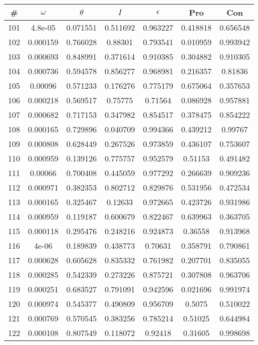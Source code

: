 \newpage
\begin{table}
\begin{tabular}{c|c|c|c|c|c|c}
\# & $\omega$ & $\theta$ & $I$ & $\epsilon$ & Pro & Con\\
\hline
101 & 4.8e-05 & 0.071551 & 0.511692 & 0.963227 & 0.418818 & 0.656548\\
102 & 0.000159 & 0.766028 & 0.88301 & 0.793541 & 0.010959 & 0.993942\\
103 & 0.000693 & 0.848991 & 0.371614 & 0.910385 & 0.304882 & 0.910305\\
104 & 0.000736 & 0.594578 & 0.856277 & 0.968981 & 0.216357 & 0.81836\\
105 & 0.00096 & 0.571233 & 0.176276 & 0.775179 & 0.675064 & 0.357653\\
106 & 0.000218 & 0.569517 & 0.75775 & 0.71564 & 0.086928 & 0.957881\\
107 & 0.000682 & 0.717153 & 0.347982 & 0.854517 & 0.378475 & 0.854222\\
108 & 0.000165 & 0.729896 & 0.040709 & 0.994366 & 0.439212 & 0.99767\\
109 & 0.000808 & 0.628449 & 0.267526 & 0.973859 & 0.436107 & 0.753607\\
110 & 0.000959 & 0.139126 & 0.775757 & 0.952579 & 0.51153 & 0.491482\\
111 & 0.00066 & 0.700408 & 0.445059 & 0.977292 & 0.266639 & 0.909236\\
112 & 0.000971 & 0.382353 & 0.802712 & 0.829876 & 0.531956 & 0.472534\\
113 & 0.000165 & 0.325467 & 0.12633 & 0.972665 & 0.423726 & 0.931986\\
114 & 0.000959 & 0.119187 & 0.600679 & 0.822467 & 0.639963 & 0.363705\\
115 & 0.000118 & 0.295476 & 0.248216 & 0.924873 & 0.36558 & 0.913968\\
116 & 4e-06 & 0.189839 & 0.438773 & 0.70631 & 0.358791 & 0.790861\\
117 & 0.000628 & 0.605628 & 0.835332 & 0.761982 & 0.207701 & 0.835055\\
118 & 0.000285 & 0.542339 & 0.273226 & 0.875721 & 0.307808 & 0.963706\\
119 & 0.000251 & 0.683527 & 0.791091 & 0.942596 & 0.021696 & 0.991974\\
120 & 0.000974 & 0.545377 & 0.490809 & 0.956709 & 0.5075 & 0.510022\\
121 & 0.000769 & 0.570545 & 0.383256 & 0.785214 & 0.51025 & 0.644984\\
122 & 0.000108 & 0.807549 & 0.118072 & 0.92418 & 0.31605 & 0.998698\\

\end{tabular}
\end{table}
